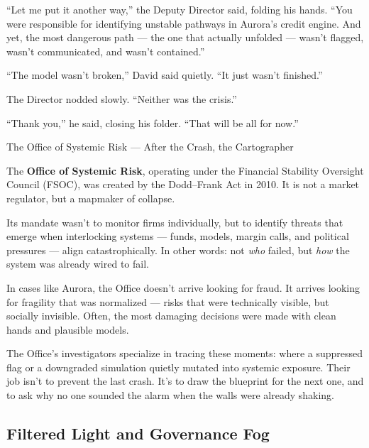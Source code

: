 ``Let me put it another way,'' the Deputy Director said, folding his hands. ``You were responsible 
for identifying unstable pathways in Aurora’s credit engine. And yet, the most dangerous path — 
the one that actually unfolded — wasn’t flagged, wasn’t communicated, and wasn’t contained.''

``The model wasn’t broken,'' David said quietly. ``It just wasn’t finished.''

The Director nodded slowly. ``Neither was the crisis.''

``Thank you,'' he said, closing his folder. ``That will be all for now.''

\medskip

\begin{HistoricalSidebar}{The Office of Systemic Risk --- After the Crash, the Cartographer}

  The \textbf{Office of Systemic Risk}, operating under the Financial Stability Oversight Council (FSOC), 
  was created by the Dodd–Frank Act in 2010. It is not a market regulator, but a mapmaker of collapse.

  \medskip
  
  Its mandate wasn’t to monitor firms individually, but to identify threats that emerge when interlocking 
  systems --- funds, models, margin calls, and political pressures --- align catastrophically. In other words: 
  not \textit{who} failed, but \textit{how} the system was already wired to fail.

  \medskip
  
  In cases like Aurora, the Office doesn’t arrive looking for fraud. It arrives looking for fragility that 
  was normalized — risks that were technically visible, but socially invisible. Often, the most damaging 
  decisions were made with clean hands and plausible models.

  \medskip
  
  The Office’s investigators specialize in tracing these moments: where a suppressed flag or a downgraded 
  simulation quietly mutated into systemic exposure. Their job isn’t to prevent the last crash. It’s to 
  draw the blueprint for the next one, and to ask why no one sounded the alarm when the walls were 
  already shaking.
  
\end{HistoricalSidebar}

\medskip

\subsection{Filtered Light and Governance Fog}

